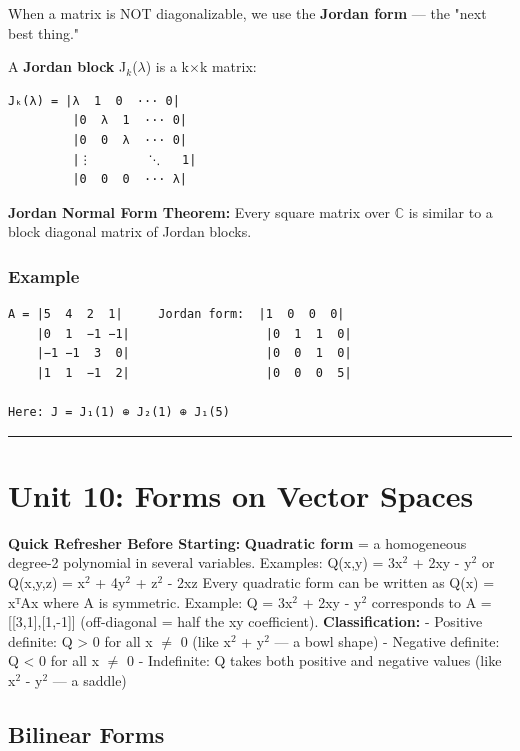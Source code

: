 \documentclass[12pt,a4paper,openany]{book}
\begin{document}
{{When a matrix is NOT diagonalizable, we use the \textbf{Jordan form} — the "next best thing."

A \textbf{Jordan block} J$_k$($\lambda$) is a k$\times$k matrix:
\begin{verbatim}
Jₖ(λ) = |λ  1  0  ··· 0|
         |0  λ  1  ··· 0|
         |0  0  λ  ··· 0|
         |⋮        ⋱   1|
         |0  0  0  ··· λ|
\end{verbatim}

\textbf{Jordan Normal Form Theorem:} Every square matrix over $\mathbb{C}$ is similar to a block diagonal matrix of Jordan blocks.

\subsubsection{Example}
\begin{verbatim}
A = |5  4  2  1|     Jordan form:  |1  0  0  0|
    |0  1  −1 −1|                   |0  1  1  0|
    |−1 −1  3  0|                   |0  0  1  0|
    |1  1  −1  2|                   |0  0  0  5|

Here: J = J₁(1) ⊕ J₂(1) ⊕ J₁(5)
\end{verbatim}

\bigskip\noindent\rule{\textwidth}{0.4pt}\bigskip

\section{Unit 10: Forms on Vector Spaces}

\begin{prereqbox}
 \textbf{Quick Refresher Before Starting:}
\textbf{Quadratic form} = a homogeneous degree-2 polynomial in several variables.
Examples: Q(x,y) = 3x$^2$ + 2xy - y$^2$ or Q(x,y,z) = x$^2$ + 4y$^2$ + z$^2$ - 2xz
Every quadratic form can be written as Q(x) = xᵀAx where A is symmetric.
Example: Q = 3x$^2$ + 2xy - y$^2$ corresponds to A = [[3,1],[1,-1]] (off-diagonal = half the xy coefficient).
\textbf{Classification:}
- Positive definite: Q > 0 for all x $\neq$ 0 (like x$^2$ + y$^2$ — a bowl shape)
- Negative definite: Q < 0 for all x $\neq$ 0
- Indefinite: Q takes both positive and negative values (like x$^2$ - y$^2$ — a saddle)
\end{prereqbox}


\subsection{Bilinear Forms}

}}
\end{document}
